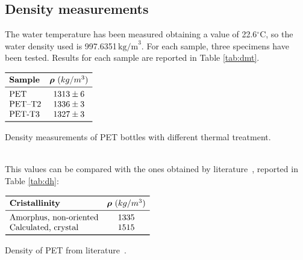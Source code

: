\documentclass[a4paper, 11pt]{article}
\begin{document}
\subsection{Density measurements}

The water temperature has been measured  obtaining a value of 22.6$^\circ$C, so the water density used is 997.6351$\, \text{kg/m}^{3}$. For each sample, three specimens have been tested. Results for each sample are reported in Table \ref{tab:dmt}. 
\begin{table}[htp]
\centering
$
\begin{array}{lcc}
\toprule
\textbf{Sample} & \boldsymbol{\rho}\,\,({kg/m^{3}})\\
\midrule
\text{PET} & 1313\pm 6\\
\text{PET–T2} & 1336\pm 3 \\
\text{PET-T3} & 1327\pm 3 \\
\bottomrule
\end{array}
$
\caption{Density measurements of PET bottles with different thermal treatment.}
\label{tab:dmt}
\end{table}\\
This values can be compared with the ones obtained by literature~\cite{handbook}, reported in Table \ref{tab:dh}:
\begin{table}[htp]
\centering
$
\begin{array}{lc}
\toprule
\textbf{Cristallinity} & \boldsymbol{\rho}\,\,({kg/m^{3}})\\
\midrule
\text{Amorphus, non-oriented} & 1335\\
\text{Calculated, crystal} & 1515 \\
\bottomrule
\end{array}
$
\caption{Density of PET from literature~\cite{handbook}.}
\label{tab:dh}
\end{table}
\end{document}
